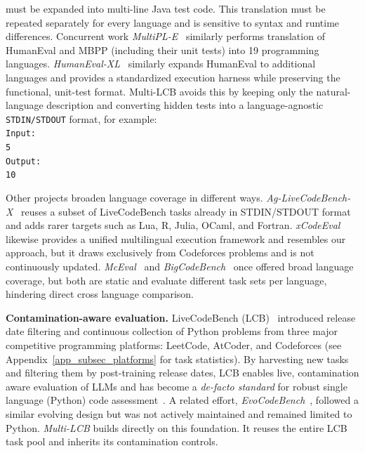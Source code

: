 \documentclass{llmxive}
\begin{document}
must be expanded into multi-line Java test code. This translation must be repeated separately for every language and is sensitive to syntax and runtime differences. Concurrent work \textit{MultiPL-E}~\citep{cassano2023multipl} similarly performs  translation of HumanEval and MBPP (including their unit tests) into 19 programming languages. \textit{HumanEval-XL}~\citep{peng2024humaneval} similarly expands HumanEval to additional languages and provides a standardized execution harness while preserving the functional, unit-test format. Multi-LCB avoids this by keeping only the natural-language description and converting hidden tests into a language-agnostic \texttt{STDIN/STDOUT}
 format, for example: \texttt{
\noindent{}\\
 Input:\\
5\\
 Output:\\
10}

Other projects broaden language coverage in different ways. \textit{Ag-LiveCodeBench-X}~\citep{boruch2025agnostics} reuses a subset of LiveCodeBench tasks already in STDIN/STDOUT format and adds rarer targets such as Lua, R, Julia, OCaml, and Fortran. 
\textit{xCodeEval}~\citep{khan2023xcodeeval} likewise provides a unified multilingual execution framework and resembles our approach, but it draws exclusively from Codeforces problems and is not continuously updated. 
\textit{McEval}~\citep{chai2024mceval} and \textit{BigCodeBench}~\citep{zhuo2024bigcodebench} once offered broad language coverage, but both are static and evaluate different task sets per language, hindering direct cross language comparison.


\textbf{Contamination-aware evaluation.} LiveCodeBench (LCB)~\citep{jain2024livecodebench} introduced release date filtering and continuous collection of Python problems from three major competitive programming platforms: LeetCode, AtCoder, and Codeforces (see Appendix~\ref{app_subsec_platforms} for task statistics).  
By harvesting new tasks and filtering them by post-training release dates, LCB enables live, contamination aware evaluation of LLMs and has become a \textit{de-facto standard} for robust single language (Python) code assessment~\citep{comanici2025gemini, yang2025qwen3, liu2024deepseek}. A related effort, \textit{EvoCodeBench}~\citep{li2024evocodebench}, followed a similar evolving design but was not actively maintained and remained limited to Python.
\textit{Multi-LCB} builds directly on this foundation. It reuses the entire LCB~\citep{jain2024livecodebench} task pool and inherits its contamination controls. %
\end{document}

